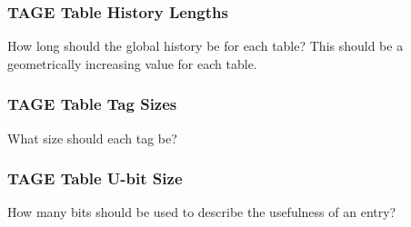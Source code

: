 \subsubsection{TAGE Table History Lengths}

How long should the global history be for each table? This should be a geometrically increasing value for each table.

\subsubsection{TAGE Table Tag Sizes}

What size should each tag be?

\subsubsection{TAGE Table U-bit Size}

How many bits should be used to describe the usefulness of an entry?

